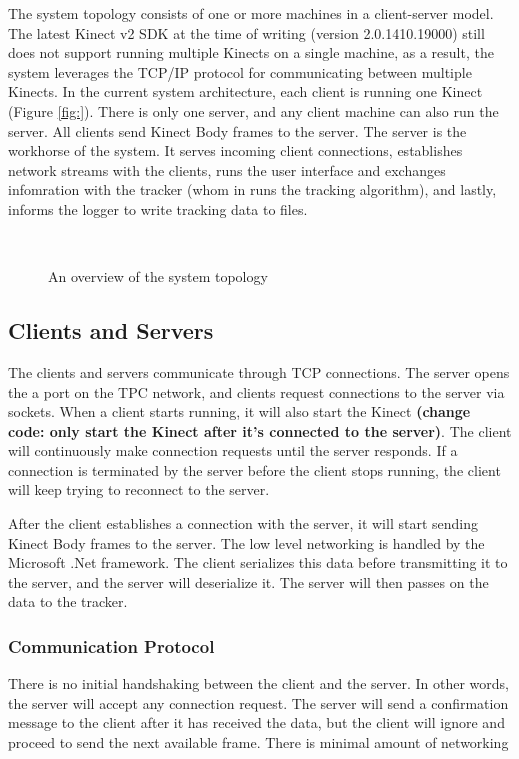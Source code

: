 \documentclass{sigchi}
\begin{document}
The system topology consists of one or more machines in a client-server model. The latest Kinect v2 SDK at the time of writing (version 2.0.1410.19000) still does not support running multiple Kinects on a single machine, as a result, the system leverages the TCP/IP protocol for communicating between multiple Kinects. In the current system architecture, each client is running one Kinect (Figure \ref{fig:}). There is only one server, and any client machine can also run the server. All clients send Kinect Body frames to the server. The server is the workhorse of the system. It serves incoming client connections, establishes network streams with the clients, runs the user interface and exchanges infomration with the tracker (whom in runs the tracking algorithm), and lastly, informs the logger to write tracking data to files.

\begin{figure}[!h]
  \centering
  
  \caption{An overview of the system topology}~\label{fig:system_diagram}
\end{figure}

\subsection{Clients and Servers}

The clients and servers communicate through TCP connections. The server opens the a port on the TPC network, and clients request connections to the server via sockets. When a client starts running, it will also start the Kinect \textbf{(change code: only start the Kinect after it's connected to the server)}. The client will continuously make connection requests until the server responds. If a connection is terminated by the server before the client stops running, the client will keep trying to reconnect to the server.

After the client establishes a connection with the server, it will start sending Kinect Body frames to the server. The low level networking is handled by the Microsoft .Net framework. The client serializes this data before transmitting it to the server, and the server will deserialize it. The server will then passes on the data to the tracker.

\subsubsection{Communication Protocol}

There is no initial handshaking between the client and the server. In other words, the server will accept any connection request. The server will send a confirmation message to the client after it has received the data, but the client will ignore and proceed to send the next available frame. There is minimal amount of networking
\end{document}
